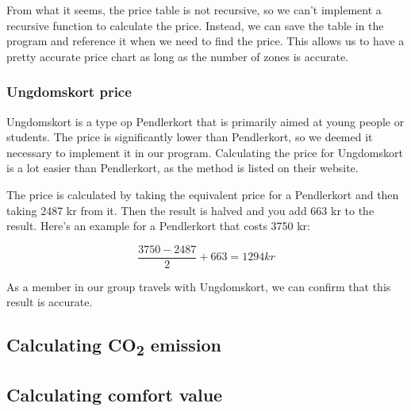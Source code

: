 From what it seems, the price table is not recursive, so we can't implement a recursive function to calculate the price.
Instead, we can save the table in the program and reference it when we need to find the price.
This allows us to have a pretty accurate price chart as long as the number of zones is accurate.

\subsubsection{Ungdomskort price}

Ungdomskort is a type op Pendlerkort that is primarily aimed at young people or students.
The price is significantly lower than Pendlerkort, so we deemed it necessary to implement it in our program.
Calculating the price for Ungdomskort is a lot easier than Pendlerkort, as the method is listed on their website. %

The price is calculated by taking the equivalent price for a Pendlerkort and then taking 2487 kr from it.
Then the result is halved and you add 663 kr to the result.
Here's an example for a Pendlerkort that costs 3750 kr:

\begin{equation}
    \frac{3750 - 2487}{2} + 663 = 1294 kr
\end{equation}

As a member in our group travels with Ungdomskort, we can confirm that this result is accurate.

\subsection{Calculating \unit{CO_{2}} emission}

\subsection{Calculating comfort value}

